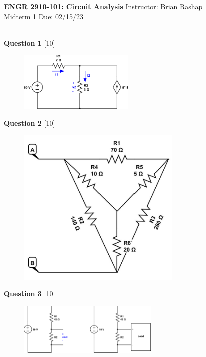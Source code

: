 \documentclass[12pt]{article}
\begin{document}
\begin{center}
\hfil
{\large\bf {ENGR 2910-101: Circuit Analysis}}
\hfill Instructor: Brian Rashap\\
Midterm 1  \hfill Due: 02/15/23\\
\hrulefill\\
\end{center}

{\bf Question 1} [10] %



\begin{figure}[h!]
\centering 
\includegraphics[clip,width=0.49\textwidth]{mid1_1.png}
\end{figure}

{\bf Question 2} [10] %

\begin{figure}[h!]
  \centering 
 \vspace{-0.1in}
 \includegraphics[clip,width=0.7\textwidth]{mid1_2.jpg}
\vspace{-0.1in}
\end{figure}


\newpage
{\bf Question 3} [10] %

\begin{figure}[h!]
     \centering
\vspace{-0.1in}
       \includegraphics[clip,width=0.6\textwidth]{mid1_3.png}
\vspace{-0.15in}
\end{figure}
\end{document}
